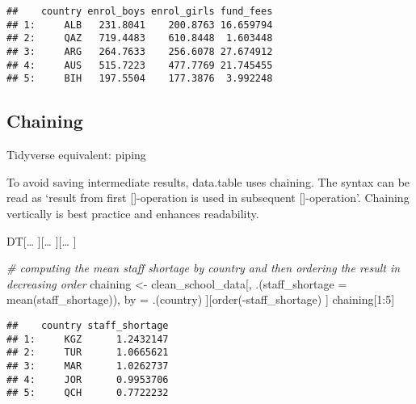 \documentclass[
]{article}
\newenvironment{Shaded}{\begin{snugshade}}{\end{snugshade}}
\newcommand{\AttributeTok}[1]{\textcolor[rgb]{0.77,0.63,0.00}{#1}}
\newcommand{\CommentTok}[1]{\textcolor[rgb]{0.56,0.35,0.01}{\textit{#1}}}
\newcommand{\DecValTok}[1]{\textcolor[rgb]{0.00,0.00,0.81}{#1}}
\newcommand{\FunctionTok}[1]{\textcolor[rgb]{0.00,0.00,0.00}{#1}}
\newcommand{\NormalTok}[1]{#1}
\newcommand{\OtherTok}[1]{\textcolor[rgb]{0.56,0.35,0.01}{#1}}
\newcommand{\SpecialCharTok}[1]{\textcolor[rgb]{0.00,0.00,0.00}{#1}}
\begin{document}
\begin{verbatim}
##    country enrol_boys enrol_girls fund_fees
## 1:     ALB   231.8041    200.8763 16.659794
## 2:     QAZ   719.4483    610.8448  1.603448
## 3:     ARG   264.7633    256.6078 27.674912
## 4:     AUS   515.7223    477.7769 21.745455
## 5:     BIH   197.5504    177.3876  3.992248
\end{verbatim}

\hypertarget{chaining}{%
\subsection{Chaining}\label{chaining}}

{Tidyverse equivalent: piping}

To avoid saving intermediate results, data.table uses chaining. The
syntax can be read as `result from first {[}{]}-operation is used in
subsequent {[}{]}-operation'. Chaining vertically is best practice and
enhances readability.

DT{[}\ldots{} {]}{[}\ldots{} {]}{[}\ldots{} {]}

\begin{Shaded}
\begin{Highlighting}[]
\CommentTok{\# computing the mean staff shortage by country and then ordering the result in decreasing order}
\NormalTok{chaining }\OtherTok{\textless{}{-}}\NormalTok{ clean\_school\_data[,}
\NormalTok{                              .(}\AttributeTok{staff\_shortage =} \FunctionTok{mean}\NormalTok{(staff\_shortage)), }
\NormalTok{                              by }\OtherTok{=}\NormalTok{ .(country)}
\NormalTok{                  ][}\FunctionTok{order}\NormalTok{(}\SpecialCharTok{{-}}\NormalTok{staff\_shortage)}
\NormalTok{                    ]}
\NormalTok{chaining[}\DecValTok{1}\SpecialCharTok{:}\DecValTok{5}\NormalTok{]}
\end{Highlighting}
\end{Shaded}

\begin{verbatim}
##    country staff_shortage
## 1:     KGZ      1.2432147
## 2:     TUR      1.0665621
## 3:     MAR      1.0262737
## 4:     JOR      0.9953706
## 5:     QCH      0.7722232
\end{verbatim}
\end{document}
